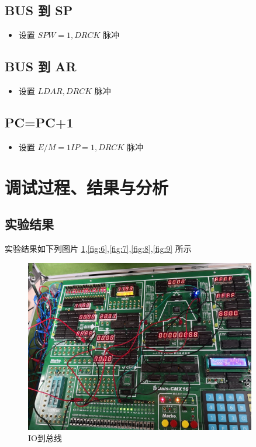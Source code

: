 \documentclass[a4paper,10pt,UTF8]{paper}
\numberwithin{equation}{section}
\numberwithin{figure}{section}
\begin{document}
\subsection{BUS 到 SP}

\begin{itemize}
  \item 设置 $SPW=1, DRCK$ 脉冲
\end{itemize}


\subsection{BUS 到 AR}

\begin{itemize}
  \item 设置 $LDAR, DRCK$ 脉冲
\end{itemize}

\subsection{PC=PC+1}

\begin{itemize}
  \item 设置 $E/M=1 IP=1, DRCK$ 脉冲
\end{itemize}

\section{调试过程、结果与分析}

\subsection{实验结果}

实验结果如下列图片 \ref{fig:5},\ref{fig:6},\ref{fig:7},\ref{fig:8},\ref{fig:9} 所示


\begin{figure}[h]
  \centering
  \includegraphics[width=0.9\textwidth]{io到总线.jpg}
  \caption{IO到总线}
  \label{fig:5}
\end{figure}
\end{document}
